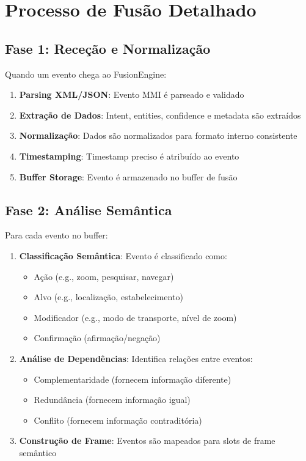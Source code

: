 \section{Processo de Fusão Detalhado}

\subsection{Fase 1: Receção e Normalização}

Quando um evento chega ao FusionEngine:

\begin{enumerate}
    \item \textbf{Parsing XML/JSON}: Evento MMI é parseado e validado
    \item \textbf{Extração de Dados}: Intent, entities, confidence e metadata são extraídos
    \item \textbf{Normalização}: Dados são normalizados para formato interno consistente
    \item \textbf{Timestamping}: Timestamp preciso é atribuído ao evento
    \item \textbf{Buffer Storage}: Evento é armazenado no buffer de fusão
\end{enumerate}

\subsection{Fase 2: Análise Semântica}

Para cada evento no buffer:

\begin{enumerate}
    \item \textbf{Classificação Semântica}: Evento é classificado como:
    \begin{itemize}
        \item Ação (e.g., zoom, pesquisar, navegar)
        \item Alvo (e.g., localização, estabelecimento)
        \item Modificador (e.g., modo de transporte, nível de zoom)
        \item Confirmação (afirmação/negação)
    \end{itemize}

    \item \textbf{Análise de Dependências}: Identifica relações entre eventos:
    \begin{itemize}
        \item Complementaridade (fornecem informação diferente)
        \item Redundância (fornecem informação igual)
        \item Conflito (fornecem informação contraditória)
    \end{itemize}

    \item \textbf{Construção de Frame}: Eventos são mapeados para slots de frame semântico
\end{enumerate}

